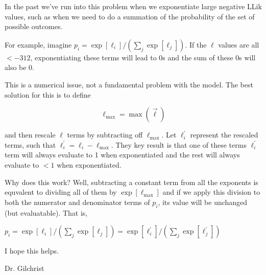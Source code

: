 \documentclass[12pt,hyperref]{labbook}
\newcommand{\LLik}{\ell}
\begin{document}
In the past we've run into this problem when we exponentiate large
negative LLik values, such as when we need to do a summation of the
probability of the set of possible outcomes.

For example, imagine $p_i = \exp[\LLik_i]/(\sum_j \exp[\LLik_j])$. If
the $\LLik$ values are all $< -312$, exponentiating these terms will lead to
0s and the sum of these 0s will also be 0.

This is a numerical issue, not a fundamental problem with the model.
The best solution for this is to define

\begin{equation}
\LLik_{\max} = \max(\vec{\LLik})
\end{equation}

and then rescale $\LLik$ terms by subtracting off $\LLik_{\max}$. Let
$\LLik_i^\prime$ represent the rescaled terms, such that $\LLik_i^\prime
= \LLik_i - \LLik_{\max}$.  They key result is that one of these terms
$\LLik_i^\prime$ term will always evaluate to 1 when exponentiated and
the rest will always evaluate to $< 1$ when exponentiated.

Why does this work?  Well,  subtracting a constant term from all the
exponents is equvalent to dividing all of them by $\exp[\LLik_{\max}]$ and
if we apply this division to both the numerator and denominator terms of
$p_i$, its value will be unchanged (but evaluatable). That is,

$p_i = \exp[\LLik_i]/(\sum_j \exp[\LLik_j])
    = \exp[\LLik_i^\prime]/(\sum_j \exp[\LLik_j^\prime])
$

I hope this helps.

Dr. Gilchrist
\end{document}
